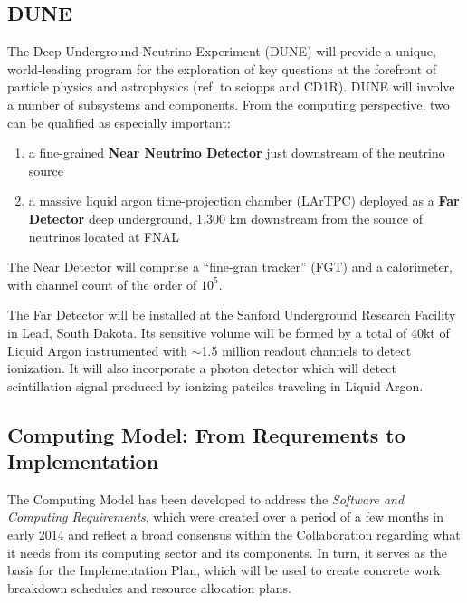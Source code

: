 \subsection{DUNE}

The Deep Underground Neutrino Experiment (DUNE) will provide a unique, world-leading program
for the exploration of key questions at the forefront of particle physics and astrophysics (ref. to sciopps
and CD1R). DUNE will involve a number of subsystems and components. From the computing
perspective, two can be qualified as especially important:

\begin{enumerate}

\item a fine-grained \textbf{Near Neutrino Detector} just downstream of the neutrino source
\item a massive liquid argon time-projection chamber (LArTPC) deployed as a \textbf{Far
Detector} deep underground, 1,300 km downstream from the source of neutrinos located at FNAL

\end{enumerate}

The Near Detector will comprise a ``fine-gran tracker'' (FGT) and a calorimeter, with channel count of the order of $10^{5}$.

The Far Detector will be installed at the Sanford Underground Research Facility in Lead, South Dakota.
Its sensitive volume will be formed by a total of 40kt of Liquid Argon instrumented with $\sim$1.5 million readout
channels to detect ionization. It will also incorporate a photon detector which will detect scintillation
signal produced by ionizing patciles traveling in Liquid Argon.



\subsection{Computing Model: From Requrements to Implementation}
\label{sec:modelrole}

The Computing Model has been developed to address the \textit{Software and Computing Requirements}, which were created over a period 
of a few months in early 2014 and reflect a broad consensus within the Collaboration regarding what it needs from its computing sector and its components. In turn, it serves as the basis for the Implementation Plan, which will be used to create concrete work breakdown schedules and resource allocation plans.

